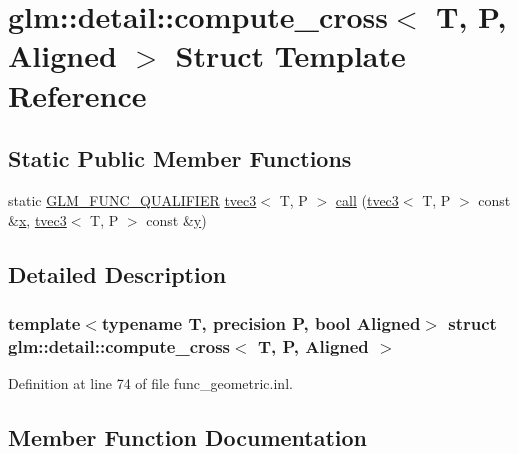 \hypertarget{structglm_1_1detail_1_1compute__cross}{}\section{glm\+::detail\+::compute\+\_\+cross$<$ T, P, Aligned $>$ Struct Template Reference}
\label{structglm_1_1detail_1_1compute__cross}
\subsection*{Static Public Member Functions}
\begin{DoxyCompactItemize}
\item 
static \mbox{\hyperlink{setup_8hpp_a33fdea6f91c5f834105f7415e2a64407}{G\+L\+M\+\_\+\+F\+U\+N\+C\+\_\+\+Q\+U\+A\+L\+I\+F\+I\+ER}} \mbox{\hyperlink{structglm_1_1tvec3}{tvec3}}$<$ T, P $>$ \mbox{\hyperlink{structglm_1_1detail_1_1compute__cross_a9b2face4658ee76688f3335542b3b3b2}{call}} (\mbox{\hyperlink{structglm_1_1tvec3}{tvec3}}$<$ T, P $>$ const \&\mbox{\hyperlink{glad_8h_a92d0386e5c19fb81ea88c9f99644ab1d}{x}}, \mbox{\hyperlink{structglm_1_1tvec3}{tvec3}}$<$ T, P $>$ const \&\mbox{\hyperlink{glad_8h_a66ddd433d2cacfe27f5906b7e86faeed}{y}})
\end{DoxyCompactItemize}


\subsection{Detailed Description}
\subsubsection*{template$<$typename T, precision P, bool Aligned$>$\newline
struct glm\+::detail\+::compute\+\_\+cross$<$ T, P, Aligned $>$}



Definition at line 74 of file func\+\_\+geometric.\+inl.



\subsection{Member Function Documentation}
\mbox{\label{structglm_1_1detail_1_1compute__cross_a9b2face4658ee76688f3335542b3b3b2}} 
